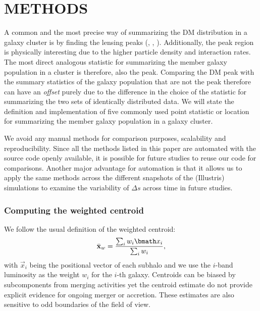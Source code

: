 \section{METHODS}\label{sec:methods}
A common and the most precise way of summarizing the DM distribution in a
galaxy cluster is by finding the lensing peaks 
(\citealt{Medezinski2013}, \citealt{Markevitch2004}, \citealt{Zitrin13}).
Additionally, the peak region is physically 
interesting due to the higher particle density and interaction rates. 
The most direct analogous statistic for summarizing the member galaxy
population in a cluster is therefore, also the peak. 
Comparing the DM peak with the summary statistics of the galaxy population that
are not the peak therefore can have an {\it offset} purely due to the difference in
the choice of the statistic for summarizing the two sets of identically
distributed data. 
We will state the definition and implementation of five commonly used 
point statistic or location for summarizing 
the member galaxy population in a galaxy cluster.

We avoid any manual methods for
comparison purposes, scalability and reproducibility. 
Since all the methods listed in this
paper are automated with the source code openly available, 
it is possible for future studies to reuse our code for comparisons. 
Another major advantage for automation is that it allows us  
to apply
the same methods across the different snapshots of the (Illustris) simulations to
examine the variability of $\Delta s$ across time in future studies. 


\subsubsection{Computing the weighted centroid}
\label{subsubsec:weighted_centroid}
We follow the usual definition of the weighted centroid: 
\begin{equation}
	\bar{\bf x}_w = \frac{\sum_i w_i \vec{x}_i}{\sum_i w_i},
\end{equation}
with $\vec{x}_i$ being the positional vector of each subhalo 
and we use the $i$-band luminosity 
as the weight $w_i$ for the $i$-th galaxy.
Centroids can be biased by subcomponents from merging activities yet the
centroid estimate do not provide explicit evidence for ongoing merger or 
accretion. These estimates are also sensitive to odd boundaries 
of the field of view.

